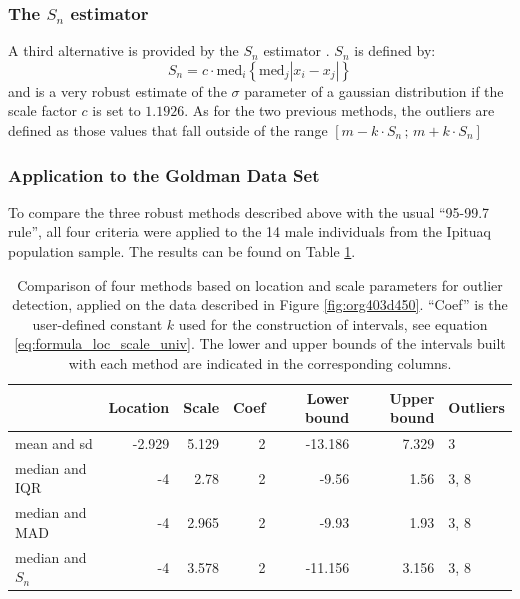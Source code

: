 \documentclass[review, 3p]{elsarticle}
\newcommand{\med}{\text{med}}
\begin{document}
\subsubsection{The \(S_n\) estimator}
\label{sec:orgcd6faef}
A third alternative is provided by the \(S_n\) estimator \citep{rousseeuw1993_AlternativesMedianAbsolute}. \(S_n\) is defined by:
\begin{equation}
S_n = c \cdot \med_i \left\{ \med_j |x_i - x_j| \right\}  \label{eq:sn}
\end{equation}
and is a very robust estimate of the \(\sigma\) parameter of a gaussian distribution if the scale factor \(c\) is set to \(1.1926\). As for the two previous methods, the outliers are defined as those values that fall outside of the range \([m - k \cdot S_n \, ; \, m + k \cdot S_n]\)

\subsubsection{Application to the Goldman Data Set}
\label{sec:orgc851503}
To compare the three robust methods described above with the usual ``95-99.7 rule'', all four criteria were applied to the 14 male individuals from the Ipituaq population sample. The results can be found on Table \ref{tab:org3e63403}.

\begin{table}[htbp]
\centering
\begin{tabular}{lrrrrrl}
 & Location & Scale & Coef & Lower bound & Upper bound & Outliers\\
\hline
mean and sd & -2.929 & 5.129 & 2 & -13.186 & 7.329 & 3\\
median and IQR & -4 & 2.78 & 2 & -9.56 & 1.56 & 3, 8\\
median and MAD & -4 & 2.965 & 2 & -9.93 & 1.93 & 3, 8\\
median and \(S_n\) & -4 & 3.578 & 2 & -11.156 & 3.156 & 3, 8\\
\end{tabular}
\caption{\label{tab:org3e63403}Comparison of four methods based on location and scale parameters for outlier detection, applied on the data described in Figure \ref{fig:org403d450}. ``Coef'' is the user-defined constant \(k\) used for the construction of intervals, see equation \eqref{eq:formula_loc_scale_univ}. The lower and upper bounds of the intervals built with each method are indicated in the corresponding columns.}

\end{table}
\end{document}
